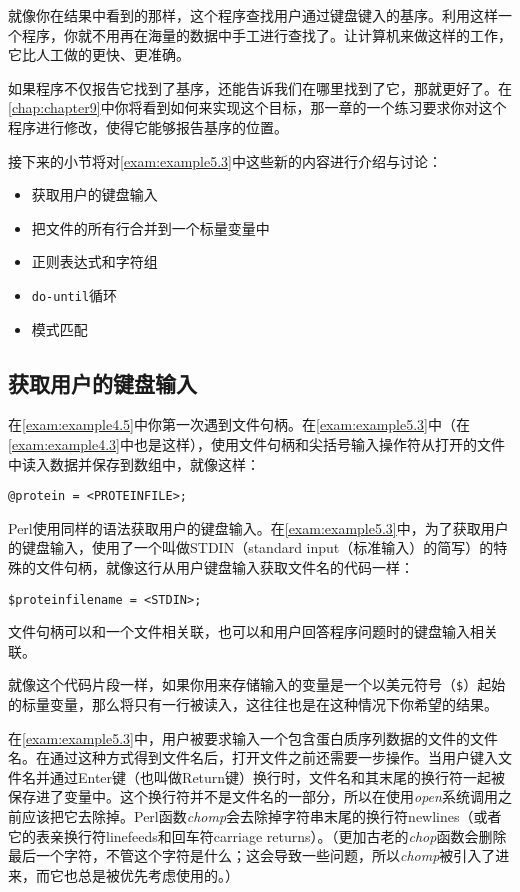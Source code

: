 就像你在结果中看到的那样，这个程序查找用户通过键盘键入的基序。利用这样一个程序，你就不用再在海量的数据中手工进行查找了。让计算机来做这样的工作，它比人工做的更快、更准确。

如果程序不仅报告它找到了基序，还能告诉我们在哪里找到了它，那就更好了。在\autoref{chap:chapter9}中你将看到如何来实现这个目标，那一章的一个练习要求你对这个程序进行修改，使得它能够报告基序的位置。

接下来的小节将对\autoref{exam:example5.3}中这些新的内容进行介绍与讨论：

\begin{itemize}
  \item 获取用户的键盘输入
  \item 把文件的所有行合并到一个标量变量中
  \item 正则表达式和字符组
  \item \verb|do-until|循环
  \item 模式匹配
\end{itemize}

\subsection{获取用户的键盘输入}
在\autoref{exam:example4.5}中你第一次遇到文件句柄。在\autoref{exam:example5.3}中（在\autoref{exam:example4.3}中也是这样），使用文件句柄和尖括号输入操作符从打开的文件中读入数据并保存到数组中，就像这样：

\begin{lstlisting}
@protein = <PROTEINFILE>;
\end{lstlisting}

Perl使用同样的语法获取用户的键盘输入。在\autoref{exam:example5.3}中，为了获取用户的键盘输入，使用了一个叫做STDIN（standard input（标准输入）的简写）的特殊的文件句柄，就像这行从用户键盘输入获取文件名的代码一样：

\begin{lstlisting}
$proteinfilename = <STDIN>;
\end{lstlisting}

文件句柄可以和一个文件相关联，也可以和用户回答程序问题时的键盘输入相关联。

就像这个代码片段一样，如果你用来存储输入的变量是一个以美元符号（\verb|$|）起始的标量变量，那么将只有一行被读入，这往往也是在这种情况下你希望的结果。

在\autoref{exam:example5.3}中，用户被要求输入一个包含蛋白质序列数据的文件的文件名。在通过这种方式得到文件名后，打开文件之前还需要一步操作。当用户键入文件名并通过Enter键（也叫做Return键）换行时，文件名和其末尾的换行符一起被保存进了变量中。这个换行符并不是文件名的一部分，所以在使用\textit{open}系统调用之前应该把它去除掉。Perl函数\textit{chomp}会去除掉字符串末尾的换行符newlines（或者它的表亲换行符linefeeds和回车符carriage returns）。（更加古老的\textit{chop}函数会删除最后一个字符，不管这个字符是什么；这会导致一些问题，所以\textit{chomp}被引入了进来，而它也总是被优先考虑使用的。）

